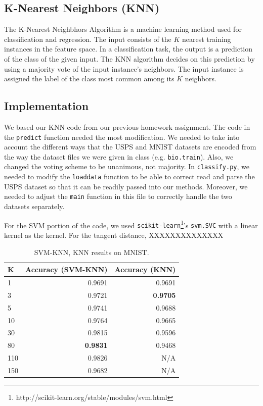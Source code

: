 \documentclass[11pt,letterpaper]{article}
\begin{document}
\subsection{K-Nearest Neighbors (KNN)}

The K-Nearest Neighbhors Algorithm is a machine learning method used for classification and regression. The input consists of the $K$ nearest training instances in the feature space. In a classification task, the output is a prediction of the class of the given input. The KNN algorithm decides on this prediction by using a majority vote of the input instance's neighbors. The input instance is assigned the label of the class most common among its $K$ neighbors.

\subsection{Implementation}

We based our KNN code from our previous homework assignment. The code in the {\tt predict} function needed the most modification. We needed to take into account the different ways that the USPS and MNIST datasets are encoded from the way the dataset files we were given in class (e.g. {\tt bio.train}). Also, we changed the voting scheme to be unanimous, not majority. In {\tt classify.py}, we needed to modify the {\tt load\textunderscore data} function to be able to correct read and parse the USPS dataset so that it can be readily passed into our methods. Moreover, we needed to adjust the {\tt main} function in this file to correctly handle the two datasets separately.

For the SVM portion of the code, we used {\tt scikit-learn}\footnote{http://scikit-learn.org/stable/modules/svm.html}'s {\tt svm.SVC} with a linear kernel as the kernel. For the tangent distance, XXXXXXXXXXXXXX

\begin{table}
\begin{center}
\begin{tabular}{|l|r|r|}
\hline \bf K & \bf Accuracy (SVM-KNN) & \bf Accuracy (KNN)\\ \hline
1 & 0.9691 & 0.9691 \\
3 & 0.9721 & \textbf{0.9705} \\
5 & 0.9741 & 0.9688 \\
10 & 0.9764 & 0.9665 \\
30 & 0.9815 & 0.9596 \\
80 & \textbf{0.9831} & 0.9468 \\
110 & 0.9826& N/A \\
150 & 0.9682 & N/A \\
\hline
\end{tabular}
\end{center}
\caption{\label{svm-knn-mnist} SVM-KNN, KNN results on MNIST. }
\end{table}
\end{document}

